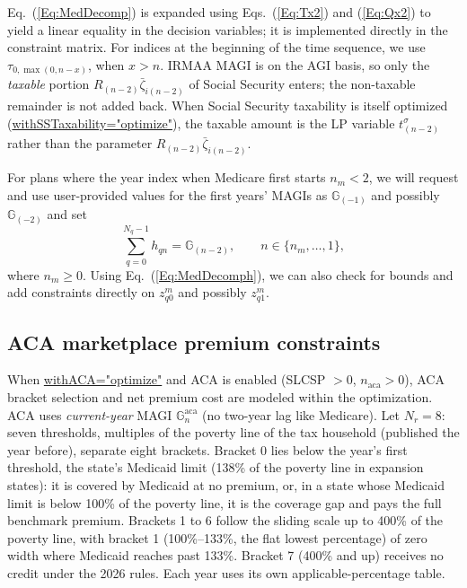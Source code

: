 \documentclass[fleqn,12pt]{report}
\newcommand{\code}[1]{\url{#1}}
\begin{document}
	Eq.~(\ref{Eq:MedDecomp}) is expanded using Eqs.~(\ref{Eq:Tx2}) and (\ref{Eq:Qx2})
	to yield a linear equality in the decision variables; it is implemented directly
	in the constraint matrix. For indices at the beginning of the time sequence,
	we use $\tau_{0, \max(0, n-x)}$, when $x>n$.
	IRMAA MAGI is on the AGI basis, so only the \emph{taxable} portion
	$R_{(n-2)}\bar{\zeta}_{i(n-2)}$ of Social Security enters; the non-taxable remainder
	is not added back. When Social Security taxability is itself optimized
	(\code{withSSTaxability="optimize"}), the taxable amount is the LP variable
	$t^\sigma_{(n-2)}$ rather than the parameter $R_{(n-2)}\bar{\zeta}_{i(n-2)}$.

	For plans where the year index when Medicare first starts $n_m<2$, we will request
	and use user-provided values for the first years' MAGIs as $\mathbb{G}_{(-1)}$ and possibly
	$\mathbb{G}_{(-2)}$ and set
	\begin{equation}
		\label{Eq:MedDecomp4}
		\sum_{q=0}^{N_q-1} h_{qn} = \mathbb{G}_{(n-2)},
		\qquad n \in \{n_m,\ldots, 1\},
	\end{equation}
	where $n_m \ge 0$.
	Using Eq.~(\ref{Eq:MedDecomph}), we can also check for bounds and add
	constraints directly on $z^m_{q0}$ and possibly $z^m_{q1}$.

\subsection{ACA marketplace premium constraints}
\label{Sec:ACA}
	When \code{withACA="optimize"} and ACA is enabled (SLCSP $> 0$, $n_{\mathrm{aca}} > 0$),
	ACA bracket selection and net premium cost are modeled within the optimization.
	ACA uses \emph{current-year} MAGI $\mathbb{G}^{\mathrm{aca}}_n$ (no two-year lag like Medicare).
	Let $N_r = 8$: seven thresholds, multiples of the poverty line of the tax household
	(published the year before), separate eight brackets.
	Bracket 0 lies below the year's first threshold, the state's Medicaid limit (138\% of the
	poverty line in expansion states): it is covered by Medicaid at no premium, or, in a state
	whose Medicaid limit is below 100\% of the poverty line, it is the coverage gap and pays the
	full benchmark premium.
	Brackets 1 to 6 follow the sliding scale up to 400\% of the poverty line, with bracket 1
	(100\%--133\%, the flat lowest percentage) of zero width where Medicaid reaches past 133\%.
	Bracket 7 (400\% and up) receives no credit under the 2026 rules.
	Each year uses its own applicable-percentage table.
\end{document}
